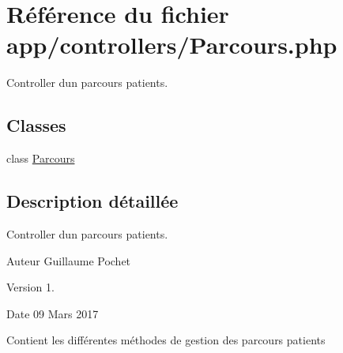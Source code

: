 \hypertarget{_parcours_8php}{}\section{Référence du fichier app/controllers/\+Parcours.php}
\label{_parcours_8php}


Controller d\textquotesingle{}un parcours patients.  


\subsection*{Classes}
\begin{DoxyCompactItemize}
\item 
class \hyperlink{class_parcours}{Parcours}
\end{DoxyCompactItemize}


\subsection{Description détaillée}
Controller d\textquotesingle{}un parcours patients. 

\begin{DoxyAuthor}{Auteur}
Guillaume Pochet 
\end{DoxyAuthor}
\begin{DoxyVersion}{Version}
1. 
\end{DoxyVersion}
\begin{DoxyDate}{Date}
09 Mars 2017
\end{DoxyDate}
Contient les différentes méthodes de gestion des parcours patients 